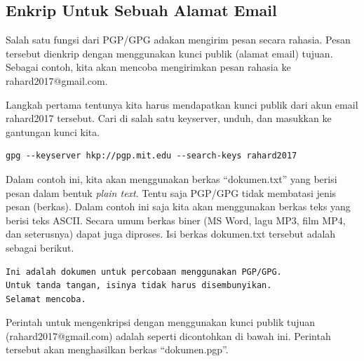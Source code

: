 \begin{mdframed}[backgroundcolor=blue!20] 
\begin{ExerciseList}
   \Exercise[title=Membuat Kunci]
\end{ExerciseList}

\end{mdframed}

\subsection{Enkrip Untuk Sebuah Alamat Email}
Salah satu fungsi dari PGP/GPG adakan mengirim pesan secara rahasia. Pesan
tersebut dienkrip dengan menggunakan kunci publik (alamat email) tujuan.
Sebagai contoh, kita akan mencoba mengirimkan pesan rahasia ke
rahard2017@gmail.com.

Langkah pertama tentunya kita harus mendapatkan kunci publik dari akun email
rahard2017 tersebut. Cari di salah satu keyserver, unduh, dan masukkan ke
gantungan kunci kita.

\begin{verbatim}
gpg --keyserver hkp://pgp.mit.edu --search-keys rahard2017
\end{verbatim}

Dalam contoh ini, kita akan menggunakan berkas ``dokumen.txt'' yang berisi
pesan dalam bentuk {\em plain text}. Tentu saja PGP/GPG tidak membatasi jenis
pesan (berkas). Dalam contoh ini saja kita akan menggunakan berkas teks yang
berisi teks ASCII. Secara umum berkas biner (MS Word, lagu MP3, film MP4, dan
seterusnya) dapat juga diproses. Isi berkas dokumen.txt tersebut adalah sebagai
berikut.

\begin{mdframed}[backgroundcolor=blue!20] 
\begin{verbatim}
Ini adalah dokumen untuk percobaan menggunakan PGP/GPG.
Untuk tanda tangan, isinya tidak harus disembunyikan.
Selamat mencoba.
\end{verbatim}
\end{mdframed}

Perintah untuk mengenkripsi dengan menggunakan kunci publik tujuan
(rahard2017@gmail.com) adalah seperti dicontohkan di bawah ini. Perintah
tersebut akan menghasilkan berkas ``dokumen.pgp''.


